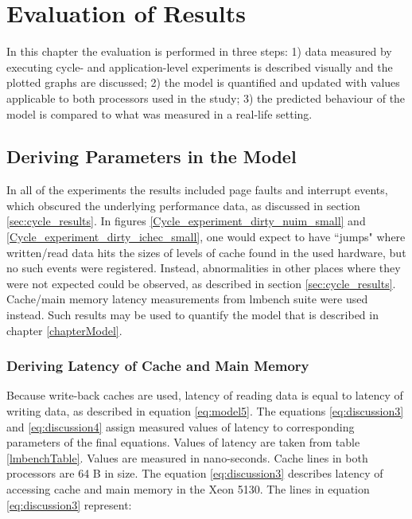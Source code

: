 
\chapter{Evaluation of Results} %
\label{discussionChapter}


\ifpdf
    \graphicspath{{7/figures/PNG/}{7/figures/PDF/}{7/figures/}}
\else
    \graphicspath{{7/figures/EPS/}{7/figures/}}
\fi



In this chapter the evaluation is performed in three steps: 1) data measured by executing cycle- and application-level experiments is described visually and the plotted graphs are discussed; 2) the model is quantified and updated with values applicable to both processors used in the study; 3) the predicted behaviour of the model is compared to what was measured in a real-life setting.

\section{Deriving Parameters in the Model}

In all of the experiments the results included page faults and interrupt events, which obscured the underlying performance data, as discussed in section \ref{sec:cycle_results}. In figures \ref{Cycle_experiment_dirty_nuim_small} and \ref{Cycle_experiment_dirty_ichec_small}, one would expect to have ``jumps" where written/read data hits the sizes of levels of cache found in the used hardware, but no such events were registered. Instead, abnormalities in other places where they were not expected could be observed, as described in section \ref{sec:cycle_results}. Cache/main memory latency measurements from lmbench suite were used instead. Such results may be used to quantify the model that is described in chapter \ref{chapterModel}.

\subsection{Deriving Latency of Cache and Main Memory}

Because write-back caches are used, latency of reading data is equal to latency of writing data, as described in equation \ref{eq:model5}. The equations \ref{eq:discussion3} and \ref{eq:discussion4} assign measured values of latency to corresponding parameters of the final equations. Values of latency are taken from table \ref{lmbenchTable}. Values are measured in nano-seconds. Cache lines in both processors are 64 B in size. The equation \ref{eq:discussion3} describes latency of accessing cache and main memory in the Xeon 5130. The lines in equation \ref{eq:discussion3} represent:

